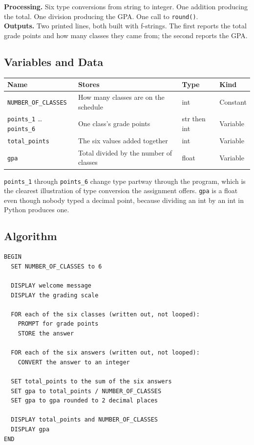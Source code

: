 \documentclass[11pt]{article}
\begin{document}
\textbf{Processing.} Six type conversions from string to integer. One addition producing the total. One division producing the GPA. One call to \texttt{round()}.\\

\textbf{Outputs.} Two printed lines, both built with f-strings. The first reports the total grade points and how many classes they came from; the second reports the GPA.\\
\subsection{Variables and Data}
\label{sec:org6e9f82e}

\begin{center}
\begin{tabular}{llll}
Name & Stores & Type & Kind\\
\hline
\texttt{NUMBER\_OF\_CLASSES} & How many classes are on the schedule & int & Constant\\
\texttt{points\_1} \ldots{} \texttt{points\_6} & One class's grade points & str then int & Variable\\
\texttt{total\_points} & The six values added together & int & Variable\\
\texttt{gpa} & Total divided by the number of classes & float & Variable\\
\end{tabular}
\end{center}

\texttt{points\_1} through \texttt{points\_6} change type partway through the program, which is the clearest illustration of type conversion the assignment offers. \texttt{gpa} is a float even though nobody typed a decimal point, because dividing an int by an int in Python produces one.\\
\subsection{Algorithm}
\label{sec:orgf6e9c86}

\begin{verbatim}
BEGIN
  SET NUMBER_OF_CLASSES to 6

  DISPLAY welcome message
  DISPLAY the grading scale

  FOR each of the six classes (written out, not looped):
    PROMPT for grade points
    STORE the answer

  FOR each of the six answers (written out, not looped):
    CONVERT the answer to an integer

  SET total_points to the sum of the six answers
  SET gpa to total_points / NUMBER_OF_CLASSES
  SET gpa to gpa rounded to 2 decimal places

  DISPLAY total_points and NUMBER_OF_CLASSES
  DISPLAY gpa
END
\end{verbatim}
\end{document}
